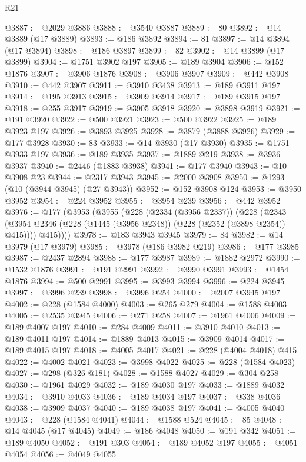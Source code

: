 \begin{lexlean}{R21}
\begin{coremodule}
@3887 := @2029 @3886
@3888 := @3540 @3887
@3889 := 80
@3892 := @14 @3889 (@17 @3889)
@3893 := @186 @3892
@3894 := 81
@3897 := @14 @3894 (@17 @3894)
@3898 := @186 @3897
@3899 := 82
@3902 := @14 @3899 (@17 @3899)
@3904 := @1751 @3902 @197
@3905 := @189 @3904
@3906 := @152 @1876
@3907 := @3906 @1876
@3908 := @3906 @3907
@3909 := @442 @3908
@3910 := @442 @3907
@3911 := @3910 @3438
@3913 := @189 @3911 @197
@3914 := @195 @3913
@3915 := @3909 @3914
@3917 := @189 @3915 @197
@3918 := @255 @3917
@3919 := @3905 @3918
@3920 := @3898 @3919
@3921 := @191 @3920
@3922 := @500 @3921
@3923 := @500 @3922
@3925 := @189 @3923 @197
@3926 := @3893 @3925
@3928 := @3879 (@3888 @3926)
@3929 := @177 @3928
@3930 := 83
@3933 := @14 @3930 (@17 @3930)
@3935 := @1751 @3933 @197
@3936 := @189 @3935
@3937 := @1889 @219
@3938 := @3936 @3937
@3940 := @2446 (@1883 @3938)
@3941 := @177 @3940
@3943 := @10 @3908 @23
@3944 := @2317 @3943
@3945 := @2000 @3908
@3950 := @1293 (@10 (@3944 @3945) (@27 @3943))
@3952 := @152 @3908 @124
@3953 := @3950 @3952
@3954 := @224 @3952
@3955 := @3954 @239
@3956 := @442 @3952
@3976 := @177
    (@3953
      (@3955
        (@228
          (@2334 (@3956 @2337))
          (@228
            (@2343 (@3954 @2346 (@228 (@1445 (@3956 @2348)) (@228 (@2352 (@3898 @2354)) @415))))
            @415))))
@3978 := @183 @3943 @3945
@3979 := 84
@3982 := @14 @3979 (@17 @3979)
@3985 := @3978 (@186 @3982 @219)
@3986 := @177 @3985
@3987 := @2437 @2894
@3988 := @177 @3987
@3989 := @1882 @2972
@3990 := @1532 @1876
@3991 := @191 @2991
@3992 := @3990 @3991
@3993 := @1454 @1876
@3994 := @500 @2991
@3995 := @3993 @3994
@3996 := @224 @3945
@3997 := @3996 @239
@3998 := @3996 @254
@4000 := @2007 @3945 @197
@4002 := @228 (@1584 @4000)
@4003 := @265 @279
@4004 := @1588 @4003
@4005 := @2535 @3945
@4006 := @271 @258
@4007 := @1961 @4006
@4009 := @189 @4007 @197
@4010 := @284 @4009
@4011 := @3910 @4010
@4013 := @189 @4011 @197
@4014 := @1889 @4013
@4015 := @3909 @4014
@4017 := @189 @4015 @197
@4018 := @4005 @4017
@4021 := @228 (@4004 @4018) @415
@4022 := @4002 @4021
@4023 := @3998 @4022
@4025 := @228 (@1584 @4023)
@4027 := @298 (@326 @181)
@4028 := @1588 @4027
@4029 := @304 @258
@4030 := @1961 @4029
@4032 := @189 @4030 @197
@4033 := @1889 @4032
@4034 := @3910 @4033
@4036 := @189 @4034 @197
@4037 := @338 @4036
@4038 := @3909 @4037
@4040 := @189 @4038 @197
@4041 := @4005 @4040
@4043 := @228 (@1584 @4041)
@4044 := @1588 @524
@4045 := 85
@4048 := @14 @4045 (@17 @4045)
@4049 := @186 @4048
@4050 := @191 @342
@4051 := @189 @4050
@4052 := @191 @303
@4054 := @189 @4052 @197
@4055 := @4051 @4054
@4056 := @4049 @4055

\end{coremodule}
\end{lexlean}
